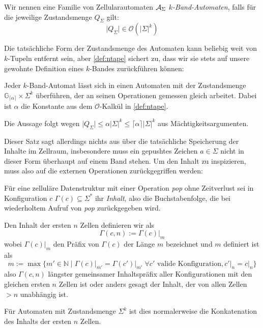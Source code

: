 \documentclass{article}
\begin{document}
\newcommand{\ca}{\ensuremath\mathcal{A}}
\newcommand{\abs}[1]{\lvert#1\rvert}
\newcommand{\ceil}[1]{\lceil#1\rceil}
\newcommand{\zrange}[1]{\mathbb{G}_{#1}}

\begin{definition}
    Wir nennen eine Familie von Zellularautomaten $\ca_\Sigma$ \emph{$k$-Band-Automaten}, falls für die jeweilige Zustandsmenge $Q_\Sigma$ gilt:
    \begin{equation}
        \abs{Q_\Sigma} \in \mathcal{O}(\abs{\Sigma}^k) \label{def:ntape}
    \end{equation}
\end{definition}

Die tatsächliche Form der Zustandsmenge des Automaten kann beliebig weit von $k$-Tupeln entfernt sein, aber \eqref{def:ntape} sichert zu, dass wir sie stets auf unsere gewohnte Definition eines $k$-Bandes zurückführen können:

\begin{satz}
    \label{thm:tape-hom}
    Jeder $k$-Band-Automat lässt sich in einen Automaten mit der Zustandsmenge $\zrange{\ceil\alpha} \times \Sigma^k$ überführen, der an seinen Operationen gemessen gleich arbeitet. Dabei ist $\alpha$ die Konstante aus dem $\mathcal{O}$-Kalkül in \eqref{def:ntape}.

    \begin{beweis}
        Die Aussage folgt wegen $\abs{Q_\Sigma} \leq \alpha \abs{\Sigma}^k \leq \ceil\alpha \abs{\Sigma}^k$ aus Mächtigkeitsargumenten.
    \end{beweis}
\end{satz}

Dieser Satz sagt allerdings nichts aus über die tatsächliche Speicherung der Inhalte im Zellraum, insbesondere muss ein gepushtes Zeichen $a \in \Sigma$ nicht in dieser Form überhaupt auf einem Band stehen. Um den Inhalt zu inspizieren, muss also auf die externen Operationen zurückgegriffen werden:

\begin{definition}
    Für eine zelluläre Datenstruktur mit einer Operation \emph{pop} ohne Zeitverlust sei in Konfiguration $c$ $\Gamma(c) \subseteq \Sigma^*$ ihr \emph{Inhalt}, also die Buchstabenfolge, die bei wiederholtem Aufruf von \emph{pop} zurückgegeben wird.

    Den Inhalt der ersten $n$ Zellen definieren wir als
        \[ \Gamma(c,n) := \Gamma(c) \big|_m \]
    wobei $\Gamma(c) \big|_m$ den Präfix von $\Gamma(c)$ der Länge $m$ bezeichnet und $m$ definiert ist als
    \[ m := \max \{m' \in \mathbb{N} \mid \Gamma(c) \big|_{m'} = \Gamma(c') \big|_{m'} \;\forall c' \text{ valide Konfiguration}, c' \big|_n = c \big|_n \} \]
    also $\Gamma(c,n)$ längster gemeinsamer Inhaltspräfix aller Konfigurationen mit den gleichen ersten $n$ Zellen ist oder anders gesagt der Inhalt, der von allen Zellen $> n$ unabhängig ist.

    Für Automaten mit Zustandsmenge $\Sigma^k$ ist dies normalerweise die Konkatenation des Inhalts der ersten $n$ Zellen.
\end{definition}
\end{document}
